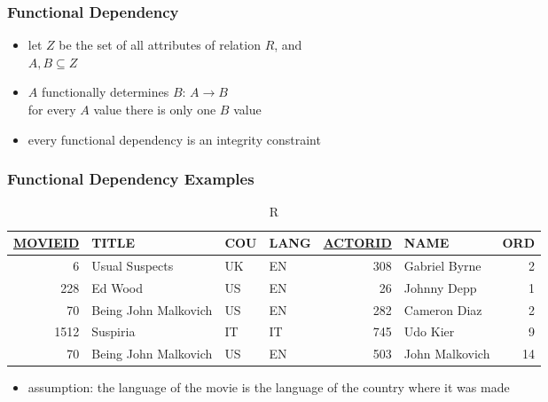 \documentclass[dvipsnames]{beamer}
\begin{document}
\begin{frame}
  \frametitle{Functional Dependency}

  \begin{definition}
    \begin{itemize}
      \item let $Z$ be the set of all attributes of relation $R$, and\\
        $A,B \subseteq Z$

      \pause
      \medskip
      \item \alert{$A$ functionally determines $B$}: $A \rightarrow B$\\
        for every $A$ value there is only one $B$ value
    \end{itemize}
  \end{definition}

  \pause
  \begin{itemize}
    \item every functional dependency is an integrity constraint
  \end{itemize}
\end{frame}

\begin{frame}
  \frametitle{Functional Dependency Examples}

  \begin{example}
    \begin{tiny}
    \begin{table}
      \caption{R}
      \begin{tabular}{|r|l|l|l|r|l|r|}\hline
\underline{MOVIEID} & TITLE    & COU & LANG & \underline{ACTORID} & NAME & ORD\\\hline\hline
      6 & Usual Suspects       & UK  &   EN &     308 & Gabriel Byrne    &   2\\\hline
    228 & Ed Wood              & US  &   EN &      26 & Johnny Depp      &   1\\\hline
     70 & Being John Malkovich & US  &   EN &     282 & Cameron Diaz     &   2\\\hline
   1512 & Suspiria             & IT  &   IT &     745 & Udo Kier         &   9\\\hline
     70 & Being John Malkovich & US  &   EN &     503 & John Malkovich   &  14\\\hline
      \end{tabular}
    \end{table}
    \end{tiny}

    \pause
    \begin{itemize}
      \item assumption: the language of the movie is the language of the country
        where it was made
    \end{itemize}
  \end{example}
\end{frame}
\end{document}
